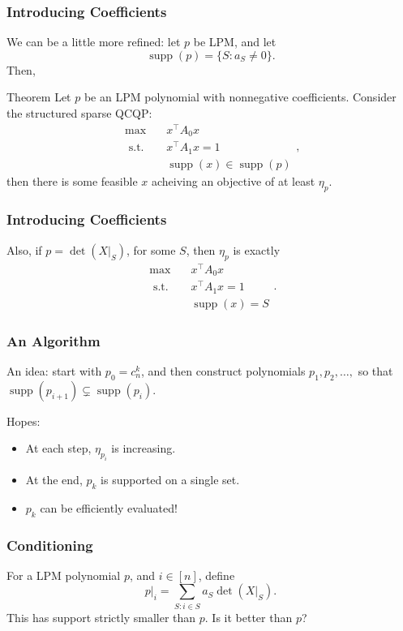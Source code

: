 \documentclass{beamer}
\DeclareMathOperator*{\supp}{supp}
\newcommand{\st}{{\text{ s.t. }}}
\begin{document}
\begin{frame}
    \frametitle{Introducing Coefficients}
    We can be a little more refined: let $p$ be LPM, and let 
    \[
        \supp(p) = \{S : a_S \neq 0\}.
    \]
    \pause
    Then,
    \begin{block}{Theorem}
        Let $p$ be an LPM polynomial with nonnegative coefficients.
        Consider the structured sparse QCQP:
        \begin{equation*}
            \begin{aligned}
                \max\quad & x^{\intercal}A_0x\\
                \st & x^{\intercal}A_1x = 1\\
                    & \supp(x) \in \supp(p)
            \end{aligned},
        \end{equation*}
        then there is some feasible $x$ acheiving an objective of at least $\eta_p$.
    \end{block}
\end{frame}
\begin{frame}
    \frametitle{Introducing Coefficients}
    Also, if $p = \det(X|_S)$, for some $S$, then $\eta_p$ is exactly
    \begin{equation*}
        \begin{aligned}
            \max\quad & x^{\intercal}A_0x\\
            \st & x^{\intercal}A_1x = 1\\
                & \supp(x) = S
        \end{aligned}.
    \end{equation*}
\end{frame}
\begin{frame}
    \frametitle{An Algorithm}
    An idea: start with $p_0 = c_n^k$, and then construct polynomials $p_1,p_2 ,\dots, $ so that $\supp(p_{i+1}) \subsetneq \supp(p_{i})$.

    Hopes:
    \begin{itemize}
        \item At each step, $\eta_{p_i}$ is increasing.
        \item At the end, $p_k$ is supported on a single set.
        \pause
        \item $p_k$ can be efficiently evaluated!
    \end{itemize}
\end{frame}
\begin{frame}
    \frametitle{Conditioning}
    For a LPM polynomial $p$, and $i \in [n]$, define
    \[
        p|_i = \sum_{S : i \in S} a_S \det(X|_S).
    \]
    This has support strictly smaller than $p$. Is it better than $p$?
\end{frame}
\end{document}
